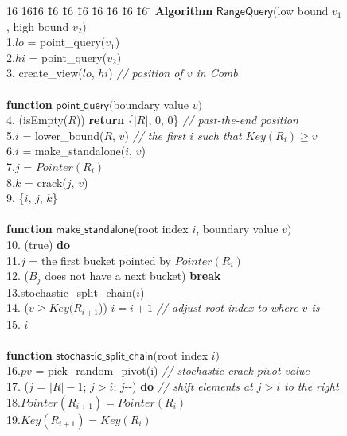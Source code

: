 \begin{figure}[t]
\begin{minipage}{4in}
{\small
\begin{tabbing}
16 16\= 16 \= 16 \= 16 \= 16 \= 16 \= 16 \= 16 \= 16 \= \kill
{\bf Algorithm} $\mathsf{RangeQuery}($low bound $v_1$, high bound $v_2)$\\
1.\>$lo$ = point\_query($v_1$)\\
2.\>$hi$ = point\_query($v_2$)\\
3. create\_view($lo$, $hi$) {\it// position of $v$ in Comb} \\
\\
{\bf function} $\mathsf{point\_query}($boundary value $v)$\\
4. (isEmpty($R$)) {\bf return} \{$|R|$, 0, 0\} {\it// past-the-end position}\\
5.\>$i$ = lower\_bound($R$, $v$) {\it// the first $i$ such that $Key(R_i) \geq v$}\\
6.\>$i$ = make\_standalone($i$, $v$)\\
7.\>$j$ = $Pointer(R_i)$\\
8.\>$k$ = crack($j$, $v$)\\
9. \{$i$, $j$, $k$\}\\
\\
{\bf function} $\mathsf{make\_standalone}($root index $i$, boundary value $v)$\\
10. (true) {\bf do}\\
11.\>\>$j$ = the first bucket pointed by $Pointer(R_i)$\\
12.\> ($B_j$ does not have a next bucket) {\bf break}\\
13.\>\>stochastic\_split\_chain($i$)\\
14.\> ($v \geq Key(R_{i+1}$)) $i = i+1$ {\it// adjust root index to where $v$ is}\\
15. $i$\\
\\
{\bf function} $\mathsf{stochastic\_split\_chain}($root index $i)$\\
16.\>$pv$ = pick\_random\_pivot(i) {\it// stochastic crack pivot value}\\
17. ($j$ = $|R|-1$; $j>i$; $j$-{}-) {\bf do} {\it// shift elements at $j > i$ to the right}\\
18.\>\>$Pointer(R_{i+1}) = Pointer(R_i)$\\
19.\>\>$Key(R_{i+1}) = Key(R_i)$\\

\end{tabbing}}
\end{minipage}
\end{figure}
